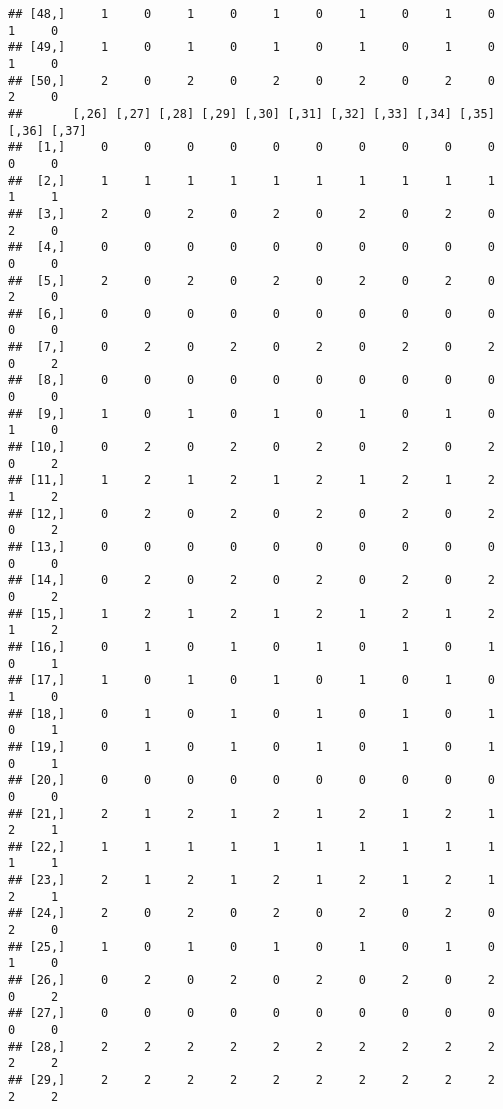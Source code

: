 \documentclass[
]{article}
\begin{document}
\begin{verbatim}
## [48,]     1     0     1     0     1     0     1     0     1     0     1     0
## [49,]     1     0     1     0     1     0     1     0     1     0     1     0
## [50,]     2     0     2     0     2     0     2     0     2     0     2     0
##       [,26] [,27] [,28] [,29] [,30] [,31] [,32] [,33] [,34] [,35] [,36] [,37]
##  [1,]     0     0     0     0     0     0     0     0     0     0     0     0
##  [2,]     1     1     1     1     1     1     1     1     1     1     1     1
##  [3,]     2     0     2     0     2     0     2     0     2     0     2     0
##  [4,]     0     0     0     0     0     0     0     0     0     0     0     0
##  [5,]     2     0     2     0     2     0     2     0     2     0     2     0
##  [6,]     0     0     0     0     0     0     0     0     0     0     0     0
##  [7,]     0     2     0     2     0     2     0     2     0     2     0     2
##  [8,]     0     0     0     0     0     0     0     0     0     0     0     0
##  [9,]     1     0     1     0     1     0     1     0     1     0     1     0
## [10,]     0     2     0     2     0     2     0     2     0     2     0     2
## [11,]     1     2     1     2     1     2     1     2     1     2     1     2
## [12,]     0     2     0     2     0     2     0     2     0     2     0     2
## [13,]     0     0     0     0     0     0     0     0     0     0     0     0
## [14,]     0     2     0     2     0     2     0     2     0     2     0     2
## [15,]     1     2     1     2     1     2     1     2     1     2     1     2
## [16,]     0     1     0     1     0     1     0     1     0     1     0     1
## [17,]     1     0     1     0     1     0     1     0     1     0     1     0
## [18,]     0     1     0     1     0     1     0     1     0     1     0     1
## [19,]     0     1     0     1     0     1     0     1     0     1     0     1
## [20,]     0     0     0     0     0     0     0     0     0     0     0     0
## [21,]     2     1     2     1     2     1     2     1     2     1     2     1
## [22,]     1     1     1     1     1     1     1     1     1     1     1     1
## [23,]     2     1     2     1     2     1     2     1     2     1     2     1
## [24,]     2     0     2     0     2     0     2     0     2     0     2     0
## [25,]     1     0     1     0     1     0     1     0     1     0     1     0
## [26,]     0     2     0     2     0     2     0     2     0     2     0     2
## [27,]     0     0     0     0     0     0     0     0     0     0     0     0
## [28,]     2     2     2     2     2     2     2     2     2     2     2     2
## [29,]     2     2     2     2     2     2     2     2     2     2     2     2

\end{verbatim}
\end{document}
